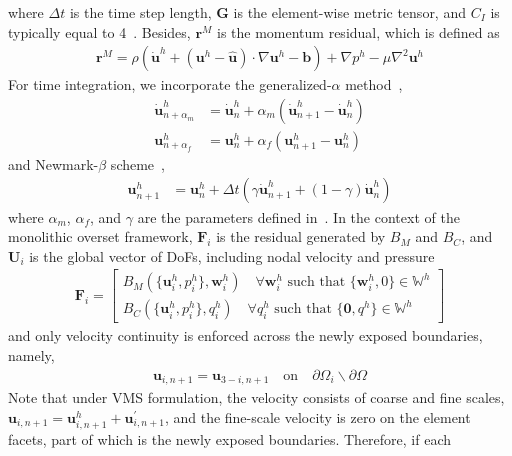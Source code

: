 \documentclass[preprint,12pt,sort&compress]{elsarticle}
\theoremstyle{definition}%
\begin{document}
where $\Delta t$ is the time step length, $\bm{G}$ is the element-wise metric tensor, and $C_I$ is typically equal to 4~\cite{Bazilevs07b,Tezduyar00a}.
Besides, $\bm{r}^M$ is the momentum residual, which is defined as
\begin{align}
  \bm{r}^M = \rho(\dot{\bm{u}}^h+(\bm{u}^h-\hat{\bm{u}})\cdot\nabla\bm{u}^h-\bm{b}) + \nabla p^h - \mu\nabla^2\bm{u}^h
\end{align}
For time integration, we incorporate the generalized-$\alpha$ method~\cite{jansen2000generalized}, 
\begin{align}
  \dot{\bm{u}}^h_{n+\alpha_m} &= \dot{\bm{u}}^h_{n} + \alpha_m (\dot{\bm{u}}^h_{n+1} - \dot{\bm{u}}^h_{n})\\
  \bm{u}^h_{n+\alpha_f} &= \bm{u}^h_{n} + \alpha_f (\bm{u}^h_{n+1} - \bm{u}^h_{n})
\end{align}
and Newmark-$\beta$ scheme~\cite{newmark1959method},
\begin{align}
  \bm{u}_{n+1}^h &= \bm{u}^h_{n} + \Delta t(\gamma \dot{\bm{u}}^h_{n+1} + (1-\gamma)\dot{\bm{u}}^h_{n}) 
\end{align}
where $\alpha_m$, $\alpha_f$, and $\gamma$ are the parameters defined in~\cite{chung1993time}.
In the context of the monolithic overset framework, $\bm{F}_i$ is the residual generated by $B_M$ and $B_C$, and $\bm{U}_{i}$ is the global vector
of DoFs, including nodal velocity and pressure
\begin{align}
  \bm{F}_i = \begin{bmatrix}
    B_M(\{\bm{u}^h_i, p^h_i\}, \bm{w}^h_i)\quad\forall \bm{w}^h_i\text{ such that }\{\bm{w}^h_i, 0\}\in\mathbb{W}^h\\
    B_C(\{\bm{u}^h_i, p^h_i\}, q^h_i)\quad\forall q^h_i\text{ such that }\{\bm{0}, q^h\}\in\mathbb{W}^h
  \end{bmatrix}
\end{align}
and only velocity continuity is enforced across the newly exposed boundaries, namely,
\begin{align}
  \bm{u}_{i,n+1}=\bm{u}_{3-i,n+1} \quad \text{on} \quad \partial\Omega_i\backslash\partial\Omega
\end{align}
Note that under VMS formulation, the velocity consists of coarse and fine scales, $\bm{u}_{i,n+1}=\bm{u}^h_{i,n+1} + \bm{u}^\prime_{i,n+1}$, and 
the fine-scale velocity is zero on the element facets, part of which is the newly exposed boundaries. Therefore, if each 
\end{document}
